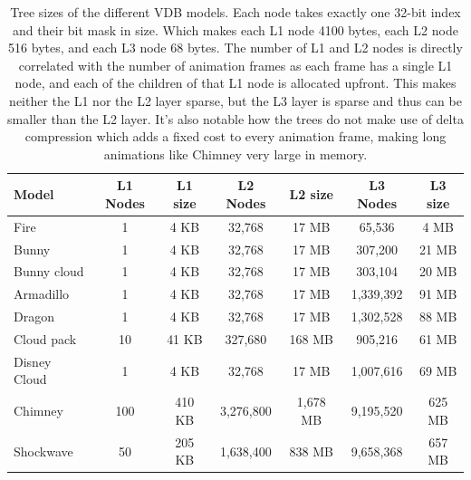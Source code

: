 \begin{table}[htbp]
    \centering
    \begin{tabularx}{\textwidth}{|X|c|c|c|c|c|c|}
        \hline
        \textbf{Model} & \textbf{L1 Nodes} & \textbf{L1 size} & \textbf{L2 Nodes} & \textbf{L2 size} & \textbf{L3 Nodes} & \textbf{L3 size} \\
        \hline
        Fire           & 1                 & 4 KB             & 32,768            & 17 MB            & 65,536            & 4 MB             \\
        \hline
        Bunny          & 1                 & 4 KB             & 32,768            & 17 MB            & 307,200           & 21 MB            \\
        \hline
        Bunny cloud    & 1                 & 4 KB             & 32,768            & 17 MB            & 303,104           & 20 MB            \\
        \hline
        Armadillo      & 1                 & 4 KB             & 32,768            & 17 MB            & 1,339,392         & 91 MB            \\
        \hline
        Dragon         & 1                 & 4 KB             & 32,768            & 17 MB            & 1,302,528         & 88 MB            \\
        \hline
        Cloud pack     & 10                & 41 KB            & 327,680           & 168 MB           & 905,216           & 61 MB            \\
        \hline
        Disney Cloud   & 1                 & 4 KB             & 32,768            & 17 MB            & 1,007,616         & 69 MB            \\
        \hline
        Chimney        & 100               & 410 KB           & 3,276,800         & 1,678 MB         & 9,195,520         & 625 MB           \\
        \hline
        Shockwave      & 50                & 205 KB           & 1,638,400         & 838 MB           & 9,658,368         & 657 MB           \\
        \hline
    \end{tabularx}
    \caption{Tree sizes of the different VDB models. Each node takes exactly one 32-bit index and their bit mask in size. Which makes each L1 node 4100 bytes, each L2 node 516 bytes, and each L3 node 68 bytes. The number of L1 and L2 nodes is directly correlated with the number of animation frames as each frame has a single L1 node, and each of the children of that L1 node is allocated upfront. This makes neither the L1 nor the L2 layer sparse, but the L3 layer is sparse and thus can be smaller than the L2 layer. It's also notable how the trees do not make use of delta compression which adds a fixed cost to every animation frame, making long animations like Chimney very large in memory.}
    \label{tab:tree_sizes}
\end{table}

